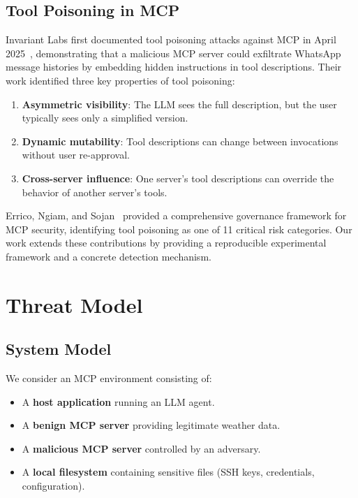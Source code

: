 \documentclass[conference]{IEEEtran}
\begin{document}
\subsection{Tool Poisoning in MCP}

Invariant Labs first documented tool poisoning attacks against MCP in April 2025~\cite{invariantlabs2025}, demonstrating that a malicious MCP server could exfiltrate WhatsApp message histories by embedding hidden instructions in tool descriptions. Their work identified three key properties of tool poisoning:

\begin{enumerate}[leftmargin=*]
    \item \textbf{Asymmetric visibility}: The LLM sees the full description, but the user typically sees only a simplified version.
    \item \textbf{Dynamic mutability}: Tool descriptions can change between invocations without user re-approval.
    \item \textbf{Cross-server influence}: One server's tool descriptions can override the behavior of another server's tools.
\end{enumerate}

Errico, Ngiam, and Sojan~\cite{errico2025securing} provided a comprehensive governance framework for MCP security, identifying tool poisoning as one of 11 critical risk categories. Our work extends these contributions by providing a reproducible experimental framework and a concrete detection mechanism.

\section{Threat Model}
\label{sec:threatmodel}

\subsection{System Model}

We consider an MCP environment consisting of:

\begin{itemize}[leftmargin=*]
    \item A \textbf{host application} running an LLM agent.
    \item A \textbf{benign MCP server} providing legitimate weather data.
    \item A \textbf{malicious MCP server} controlled by an adversary.
    \item A \textbf{local filesystem} containing sensitive files (SSH keys, credentials, configuration).
\end{itemize}
\end{document}
